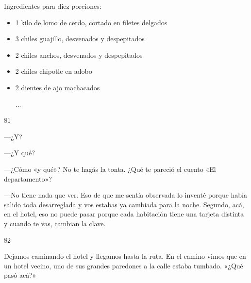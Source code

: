 \documentclass[12pt,twoside,openright,a5paper]{book}
\begin{document}
Ingredientes para diez porciones:

\begin{itemize} 
\item 1 kilo de lomo de cerdo, cortado en filetes delgados
\item 3 chiles guajillo, desvenados y despepitados  
\item 2 chiles anchos, desvenados y despepitados  
\item 2 chiles chipotle en adobo  
\item 2 dientes de ajo machacados

...
\end{itemize}


\vspace{0.5cm}

\hrulefill \hspace{0.1cm}\decofourleft\hspace{0.2cm} 81 \hspace{0.2cm}\decofourright \hspace{0.1cm}\hrulefill

\nopagebreak

\vspace{0.5cm}

\nopagebreak

---¿Y?

---¿Y qué?

---¿Cómo «y qué»? No te hagás la tonta. ¿Qué te pareció el cuento «El
departamento»?

---No tiene nada que ver. Eso de que me sentía observada lo inventé
porque había salido toda desarreglada y vos estabas ya cambiada para la
noche. Segundo, acá, en el hotel, eso no puede pasar porque cada habitación
tiene una tarjeta distinta y cuando te vas, cambian la clave.

\vspace{0.5cm}

\hrulefill \hspace{0.1cm}\decofourleft\hspace{0.2cm} 82 \hspace{0.2cm}\decofourright \hspace{0.1cm}\hrulefill

\nopagebreak

\vspace{0.5cm}

\nopagebreak

Dejamos caminando el hotel y llegamos hasta la ruta. En el camino vimos que
en un hotel vecino, uno de sus grandes paredones a la calle estaba tumbado. «¿Qué pasó
acá?»
\end{document}
